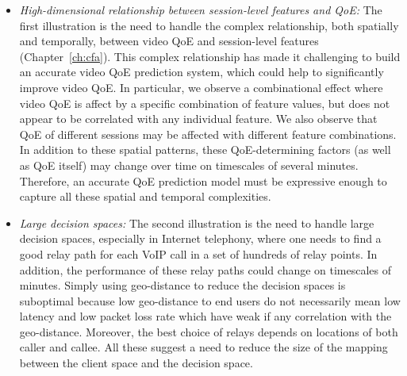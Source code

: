 \begin{itemize}

\item {\em High-dimensional relationship between session-level features and QoE:} 
The first illustration is the need to handle the complex relationship, both spatially 
and temporally, between video QoE and session-level features (Chapter~\ref{ch:cfa}).
This complex relationship has made it challenging to build an accurate video 
QoE prediction system, which could help to significantly improve video QoE.
In particular, we observe a combinational effect where video QoE is affect by 
a specific combination of feature values, but does not appear to be correlated 
with any individual feature. We also observe that QoE of different sessions 
may be affected with different feature combinations. In addition to these spatial 
patterns, these QoE-determining factors (as well as QoE itself) may change
over time on timescales of several minutes. Therefore, an accurate QoE 
prediction model must be expressive enough to capture all these spatial and 
temporal complexities.

\item {\em Large decision spaces:}
The second illustration is the need to handle large decision spaces, especially in 
Internet telephony, where one needs to find a good relay path for each VoIP call
in a set of hundreds of relay points.
In addition, the performance of these relay paths could change on timescales 
of minutes.
Simply using geo-distance to reduce the decision spaces is suboptimal because 
low geo-distance to end users do not necessarily mean low latency and low packet 
loss rate which  have weak if any correlation with the geo-distance. Moreover, the 
best choice of relays depends  on locations of both caller and callee.
All these suggest a need to reduce the size of the mapping between
the client space and the decision space.

\end{itemize}



